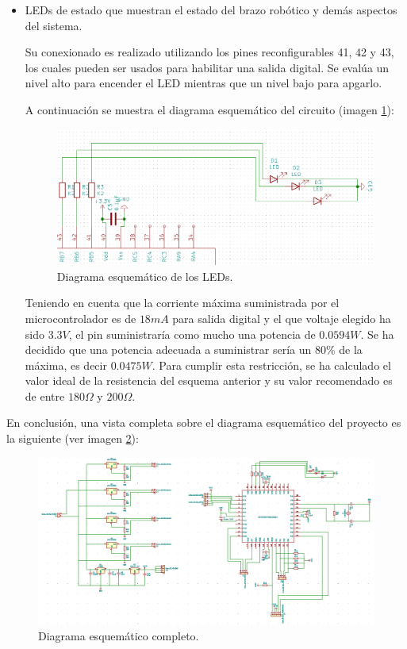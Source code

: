 \begin{itemize}
    
    \item LEDs de estado que muestran el estado del brazo robótico y demás aspectos del sistema. 
    
    Su conexionado es realizado utilizando los pines reconfigurables 41, 42 y 43, los cuales pueden ser usados para habilitar una salida digital. Se evalúa un nivel alto para encender el LED mientras que un nivel bajo para apgarlo.
    
    A continuación se muestra el diagrama esquemático del circuito (imagen \ref{fig:Led_Esquematico}):
    
    \begin{figure}[H]
    \centering 
    \includegraphics[width=.75\linewidth]{pictures/LEDS.PNG}
    \caption{Diagrama esquemático de los LEDs.}
    \label{fig:Led_Esquematico}
    \end{figure}

    Teniendo en cuenta que la corriente máxima suministrada por el microcontrolador es de $18mA$ para salida digital y el que voltaje elegido ha sido $3.3V$, el pin suministraría como mucho una potencia de $0.0594W$. Se ha decidido que una potencia adecuada a suministrar sería un 80\% de la máxima, es decir $0.0475W$. Para cumplir esta restricción, se ha calculado el valor ideal de la resistencia del esquema anterior y su valor recomendado es de entre $180 \Omega$ y $200 \Omega$.
    
\end{itemize}

En conclusión, una vista completa sobre el diagrama esquemático del proyecto es la siguiente (ver imagen \ref{fig:Diagrama_Esquematico_Final}): 

    \begin{figure}[H]
    \centering 
    \includegraphics[width=\linewidth]{pictures/EsquematicoCompleto.PNG}
    \caption{Diagrama esquemático completo.}
    \label{fig:Diagrama_Esquematico_Final}
    \end{figure}


